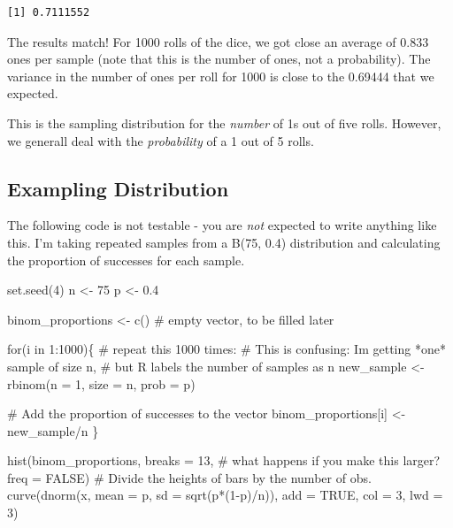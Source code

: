 \documentclass[
  letterpaper,
  DIV=11,
  numbers=noendperiod,
  oneside]{scrreprt}
\newenvironment{Shaded}{\begin{snugshade}}{\end{snugshade}}
\newcommand{\AttributeTok}[1]{\textcolor[rgb]{0.40,0.45,0.13}{#1}}
\newcommand{\CommentTok}[1]{\textcolor[rgb]{0.37,0.37,0.37}{#1}}
\newcommand{\ConstantTok}[1]{\textcolor[rgb]{0.56,0.35,0.01}{#1}}
\newcommand{\ControlFlowTok}[1]{\textcolor[rgb]{0.00,0.23,0.31}{#1}}
\newcommand{\DecValTok}[1]{\textcolor[rgb]{0.68,0.00,0.00}{#1}}
\newcommand{\FloatTok}[1]{\textcolor[rgb]{0.68,0.00,0.00}{#1}}
\newcommand{\FunctionTok}[1]{\textcolor[rgb]{0.28,0.35,0.67}{#1}}
\newcommand{\NormalTok}[1]{\textcolor[rgb]{0.00,0.23,0.31}{#1}}
\newcommand{\OtherTok}[1]{\textcolor[rgb]{0.00,0.23,0.31}{#1}}
\newcommand{\SpecialCharTok}[1]{\textcolor[rgb]{0.37,0.37,0.37}{#1}}
\begin{document}
\begin{verbatim}
[1] 0.7111552
\end{verbatim}

The results match! For 1000 rolls of the dice, we got close an average
of 0.833 ones per sample (note that this is the number of ones, not a
probability). The variance in the number of ones per roll for 1000 is
close to the 0.69444 that we expected.

This is the sampling distribution for the \emph{number} of 1s out of
five rolls. However, we generall deal with the \emph{probability} of a 1
out of 5 rolls.

\hypertarget{exampling-distribution}{%
\subsection{Exampling Distribution}\label{exampling-distribution}}

The following code is not testable - you are \emph{not} expected to
write anything like this. I'm taking repeated samples from a B(75, 0.4)
distribution and calculating the proportion of successes for each
sample.

\begin{Shaded}
\begin{Highlighting}[]
\FunctionTok{set.seed}\NormalTok{(}\DecValTok{4}\NormalTok{)}
\NormalTok{n }\OtherTok{\textless{}{-}} \DecValTok{75}
\NormalTok{p }\OtherTok{\textless{}{-}} \FloatTok{0.4}

\NormalTok{binom\_proportions }\OtherTok{\textless{}{-}} \FunctionTok{c}\NormalTok{() }\CommentTok{\# empty vector, to be filled later}

\ControlFlowTok{for}\NormalTok{(i }\ControlFlowTok{in} \DecValTok{1}\SpecialCharTok{:}\DecValTok{1000}\NormalTok{)\{ }\CommentTok{\# repeat this 1000 times:}
    \CommentTok{\# This is confusing: I\textquotesingle{}m getting *one* sample of size n,}
    \CommentTok{\# but R labels the number of samples as n}
\NormalTok{    new\_sample }\OtherTok{\textless{}{-}} \FunctionTok{rbinom}\NormalTok{(}\AttributeTok{n =} \DecValTok{1}\NormalTok{, }\AttributeTok{size =}\NormalTok{ n, }\AttributeTok{prob =}\NormalTok{ p)}
    
    \CommentTok{\# Add the proportion of successes to the vector}
\NormalTok{    binom\_proportions[i] }\OtherTok{\textless{}{-}}\NormalTok{ new\_sample}\SpecialCharTok{/}\NormalTok{n}
\NormalTok{\}}

\FunctionTok{hist}\NormalTok{(binom\_proportions, }
    \AttributeTok{breaks =} \DecValTok{13}\NormalTok{, }\CommentTok{\# what happens if you make this larger?}
    \AttributeTok{freq =} \ConstantTok{FALSE}\NormalTok{) }\CommentTok{\# Divide the heights of bars by the number of obs.}
\FunctionTok{curve}\NormalTok{(}\FunctionTok{dnorm}\NormalTok{(x, }\AttributeTok{mean =}\NormalTok{ p, }\AttributeTok{sd =} \FunctionTok{sqrt}\NormalTok{(p}\SpecialCharTok{*}\NormalTok{(}\DecValTok{1}\SpecialCharTok{{-}}\NormalTok{p)}\SpecialCharTok{/}\NormalTok{n)), }\AttributeTok{add =} \ConstantTok{TRUE}\NormalTok{, }\AttributeTok{col =} \DecValTok{3}\NormalTok{, }\AttributeTok{lwd =} \DecValTok{3}\NormalTok{)}
\end{Highlighting}
\end{Shaded}
\end{document}

